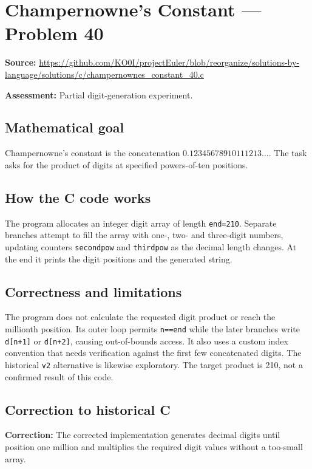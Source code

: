 \section{Champernowne's Constant --- Problem 40}
\label{prob:40}
\noindent\textbf{Source:} \url{https://github.com/KO0I/projectEuler/blob/reorganize/solutions-by-language/solutions/c/champernownes_constant_40.c}

\noindent\textbf{Assessment:} Partial digit-generation experiment.

\subsection*{Mathematical goal}
Champernowne's constant is the concatenation \(0.12345678910111213\ldots\). The task asks for the product of digits at specified powers-of-ten positions.

\subsection*{How the C code works}
The program allocates an integer digit array of length \verb|end=210|. Separate branches attempt to fill the array with one-, two- and three-digit numbers, updating counters \verb|secondpow| and \verb|thirdpow| as the decimal length changes. At the end it prints the digit positions and the generated string.

\subsection*{Correctness and limitations}
The program does not calculate the requested digit product or reach the millionth position. Its outer loop permits \verb|n==end| while the later branches write \verb|d[n+1]| or \verb|d[n+2]|, causing out-of-bounds access. It also uses a custom index convention that needs verification against the first few concatenated digits. The historical \verb|v2| alternative is likewise exploratory. The target product is 210, not a confirmed result of this code.


\subsection*{Correction to historical C}
{\color{red}\textbf{Correction:} The corrected implementation generates decimal digits until position one million and multiplies the required digit values without a too-small array.}
